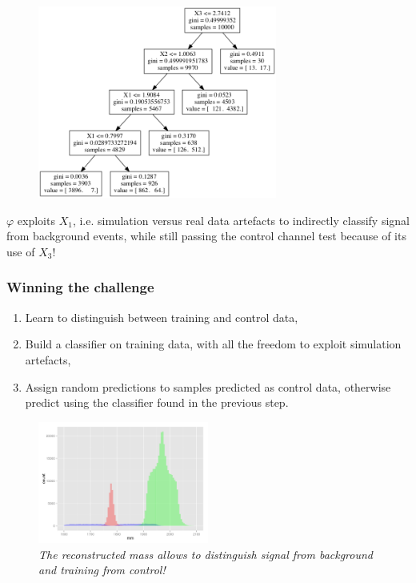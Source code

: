 \documentclass{beamer}
\begin{document}

\begin{frame}
\begin{figure}
\centering
\includegraphics[width=0.7\textwidth]{tree.png}
\end{figure}

$\varphi$ exploits $X_1$, i.e. simulation versus real data
artefacts to indirectly classify signal from background events, {\color{red}while still passing the
control channel test} because of its use of $X_3$!

\end{frame}


\begin{frame}
\frametitle{Winning the challenge}

\begin{enumerate}
\item Learn to distinguish between training and control data,
\item Build a classifier on training data, with all the freedom to exploit simulation artefacts,
\item Assign random predictions to samples predicted as control data, otherwise predict using the classifier found in the previous step.
\end{enumerate}

\begin{figure}
\centering
\includegraphics[width=0.5\textwidth]{hole.png}\\
{\it The reconstructed mass allows to distinguish {\color{red} signal} from {\color{blue} background} and training from {\color{mygreen} control}!}
\end{figure}

\end{frame}
\end{document}
